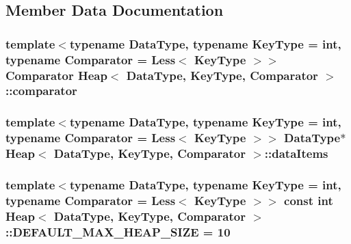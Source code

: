 \begin{DoxyEnumerate}
\item 
\end{DoxyEnumerate}


\begin{DoxyCode}
\end{DoxyCode}
 

\subsection{\-Member \-Data \-Documentation}
\hypertarget{class_heap_adc20ebd4d97dff37f19ced91ccdc4560}{
\subsubsection[{comparator}]{\setlength{\rightskip}{0pt plus 5cm}template$<$typename \-Data\-Type, typename \-Key\-Type = int, typename \-Comparator = \-Less$<$ Key\-Type $>$$>$ \-Comparator {\bf \-Heap}$<$ \-Data\-Type, \-Key\-Type, \-Comparator $>$\-::{\bf comparator}}}\label{class_heap_adc20ebd4d97dff37f19ced91ccdc4560}
\hypertarget{class_heap_ace779ec73409a031eda4a7c1b898eb56}{
\subsubsection[{data\-Items}]{\setlength{\rightskip}{0pt plus 5cm}template$<$typename \-Data\-Type, typename \-Key\-Type = int, typename \-Comparator = \-Less$<$ Key\-Type $>$$>$ \-Data\-Type$\ast$ {\bf \-Heap}$<$ \-Data\-Type, \-Key\-Type, \-Comparator $>$\-::{\bf data\-Items}}}\label{class_heap_ace779ec73409a031eda4a7c1b898eb56}
\hypertarget{class_heap_a967c19732a20a72e8e824402ad6763c8}{
\subsubsection[{\-D\-E\-F\-A\-U\-L\-T\-\_\-\-M\-A\-X\-\_\-\-H\-E\-A\-P\-\_\-\-S\-I\-Z\-E}]{\setlength{\rightskip}{0pt plus 5cm}template$<$typename \-Data\-Type, typename \-Key\-Type = int, typename \-Comparator = \-Less$<$ Key\-Type $>$$>$ const int {\bf \-Heap}$<$ \-Data\-Type, \-Key\-Type, \-Comparator $>$\-::{\bf \-D\-E\-F\-A\-U\-L\-T\-\_\-\-M\-A\-X\-\_\-\-H\-E\-A\-P\-\_\-\-S\-I\-Z\-E} = 10}}\label{class_heap_a967c19732a20a72e8e824402ad6763c8}
